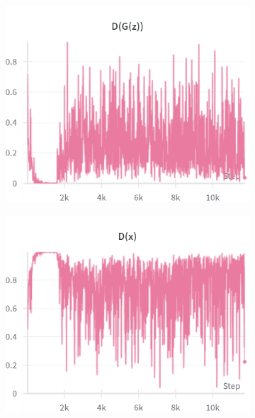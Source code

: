 \begin{figure}[H]
    \begin{subfigure}{0.45\textwidth}
        \centering
        \includegraphics[width=0.95\linewidth]{cifar10/64/D_G_z.png}
        \caption{}
        \label{subfig:cifar10/64/D_G_z}
    \end{subfigure}%
    \begin{subfigure}{0.45\textwidth}
        \centering
        \includegraphics[width=0.95\linewidth]{cifar10/64/D_x.png}
        \caption{}
        \label{subfig:cifar10/64/D_x}
    \end{subfigure}


\end{figure}

